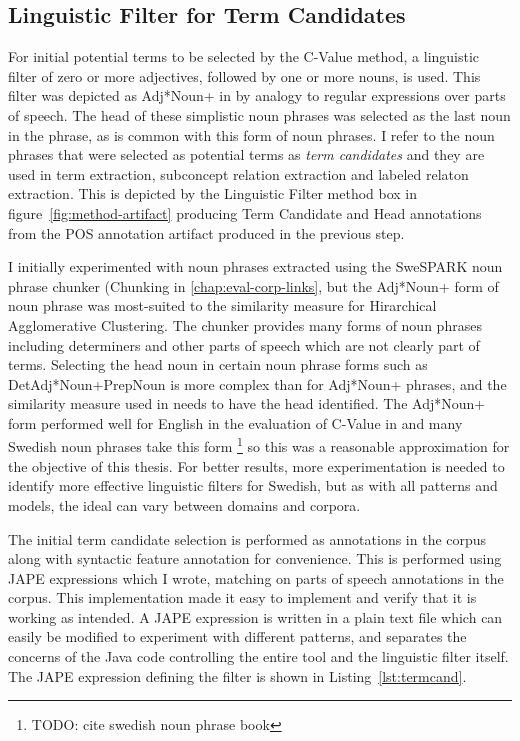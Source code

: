 \documentclass[a4paper]{report}
\newcommand{\todo}[1]{\footnote{{\color{red} TODO: #1}}}
\begin{document}
\subsection{Linguistic Filter for Term Candidates}

For initial potential terms to be selected by the C-Value method, a linguistic filter of zero or more adjectives, followed by one or more nouns, is used.
This filter was depicted as Adj*Noun+ in \cite{Frantzi98CNCValue} by analogy to regular expressions over parts of speech.
The head of these simplistic noun phrases was selected as the last noun in the phrase, as is common with this form of noun phrases.
I refer to the noun phrases that were selected as potential terms as \emph{term candidates} and they are used in term extraction, subconcept relation extraction and labeled relaton extraction.
This is depicted by the Linguistic Filter method box in figure~\ref{fig:method-artifact} producing Term Candidate and Head annotations from the POS annotation artifact produced in the previous step.

I initially experimented with noun phrases extracted using the SweSPARK noun phrase chunker (Chunking in \ref{chap:eval-corp-links}, but the Adj*Noun+ form of noun phrase was most-suited to the similarity measure for Hirarchical Agglomerative Clustering.
The chunker provides many forms of noun phrases including determiners and other parts of speech which are not clearly part of terms.
Selecting the head noun in certain noun phrase forms such as DetAdj*Noun+PrepNoun is more complex than for Adj*Noun+ phrases, and the similarity measure used in \cite{Drymonas10OntoGain} needs to have the head identified.
The Adj*Noun+ form performed well for English in the evaluation of C-Value in \cite{Frantzi98CNCValue} and many Swedish noun phrases take this form \todo{cite swedish noun phrase book} so this was a reasonable approximation for the objective of this thesis.
For better results, more experimentation is needed to identify more effective linguistic filters for Swedish, but as with all patterns and models, the ideal can vary between domains and corpora.

The initial term candidate selection is performed as annotations in the corpus along with syntactic feature annotation for convenience.
This is performed using JAPE expressions which I wrote, matching on parts of speech annotations in the corpus.
This implementation made it easy to implement and verify that it is working as intended.
A JAPE expression is written in a plain text file which can easily be modified to experiment with different patterns, and separates the concerns of the Java code controlling the entire tool and the linguistic filter itself.
The JAPE expression defining the filter is shown in Listing~\ref{lst:termcand}.
\end{document}

